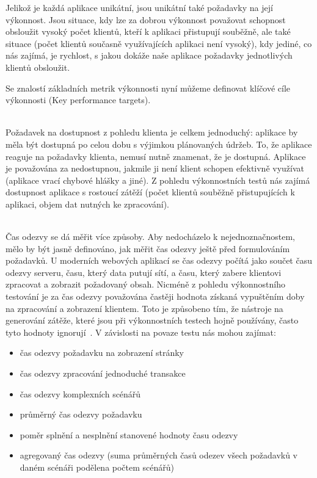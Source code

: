 \documentclass[122pt,oneside]{fithesis}
\begin{document}
Jelikož je každá aplikace unikátní, jsou unikátní také požadavky na její výkonnost. Jsou situace, kdy lze za dobrou výkonnost považovat schopnost obsloužit vysoký počet klientů, kteří k aplikaci přistupují souběžně, ale také situace (počet klientů současně využívajících aplikaci není vysoký), kdy jediné, co nás zajímá, je rychlost, s jakou dokáže naše aplikace požadavky jednotlivých klientů obsloužit.
 
Se znalostí základních metrik výkonnosti nyní můžeme definovat klíčové cíle výkonnosti (Key performance targets).

\vspace{5 mm}
\\\indent Požadavek na dostupnost z pohledu klienta je celkem jednoduchý: aplikace by měla být dostupná po celou dobu s výjimkou plánovaných údržeb. To, že aplikace reaguje na požadavky klienta, nemusí nutně znamenat, že je dostupná. Aplikace je považována za nedostupnou, jakmile ji není klient schopen efektivně využívat (aplikace vrací chybové hlášky a jiné).
Z pohledu výkonnostních testů nás zajímá dostupnost aplikace s rostoucí zátěží (počet klientů souběžně přistupujících k aplikaci, objem dat nutných ke zpracování). 

\vspace{5 mm}
\\\indent Čas odezvy se dá měřit více způsoby. Aby nedocházelo k nejednoznačnostem, mělo by být jasně definováno, jak měřit čas odezvy ještě před formulováním požadavků. U moderních webových aplikací se čas odezvy počítá jako součet času odezvy serveru, času, který data putují sítí, a času, který zabere klientovi zpracovat a zobrazit požadovaný obsah. Nicméně z pohledu výkonnostního testování je za čas odezvy považována častěji hodnota získaná vypuštěním doby na zpracování a zobrazení klientem. Toto je způsobeno tím, že nástroje na generování zátěže, které jsou při výkonnostních testech hojně používány, často tyto hodnoty ignorují~\cite{moorthy09}.
V závislosti na povaze testu nás mohou zajímat:
\begin{itemize}
  \item čas odezvy požadavku na zobrazení stránky
  \item čas odezvy zpracování jednoduché transakce
  \item čas odezvy komplexních scénářů
  \item průměrný čas odezvy požadavku
  \item poměr splnění a nesplnění stanovené hodnoty času odezvy
  \item agregovaný čas odezvy (suma průměrných časů odezev všech požadavků v daném scénáři podělena počtem scénářů)
\end{itemize}
\end{document}
